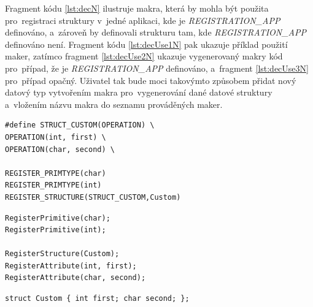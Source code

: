 \documentclass[11pt,twoside,a4paper]{book}
\begin{document}
Fragment kódu \ref{lst:decN} ilustruje makra, která by mohla být použita pro~registraci struktury v~jedné aplikaci, kde je \textit{REGISTRATION\_APP} definováno, a~zároveň by definovali strukturu tam, kde \textit{REGISTRATION\_APP} definováno není. Fragment kódu \ref{lst:decUse1N} pak ukazuje příklad použití maker, zatímco fragment \ref{lst:decUse2N} ukazuje vygenerovaný makry kód pro~případ, že je \textit{REGISTRATION\_APP} definováno, a~fragment \ref{lst:decUse3N} pro~případ opačný. Uživatel tak bude moci takovýmto způsobem přidat nový datový typ vytvořením makra pro~vygenerování dané datové struktury a~vložením názvu makra do seznamu prováděných maker.

\begin{lstlisting}[frame=single,caption=Ukázka makra\, které vytvoří/zaregistruje určitou strukturu. ,label=lst:decUse1N]
#define STRUCT_CUSTOM(OPERATION) \
OPERATION(int, first) \
OPERATION(char, second) \

REGISTER_PRIMTYPE(char)
REGISTER_PRIMTYPE(int)
REGISTER_STRUCTURE(STRUCT_CUSTOM,Custom)
\end{lstlisting}

\begin{lstlisting}[frame=single,caption=Kód vygenerovaný makrem\, který zaregistruje strukturu.,label=lst:decUse2N]
RegisterPrimitive(char);
RegisterPrimitive(int);

RegisterStructure(Custom);
RegisterAttribute(int, first);
RegisterAttribute(char, second);
\end{lstlisting}

\begin{lstlisting}[frame=single,caption=Deklarace struktury vygenerovaná pomocí makra.,label=lst:decUse3N]
struct Custom { int first; char second; };
\end{lstlisting}
 
\end{document}
